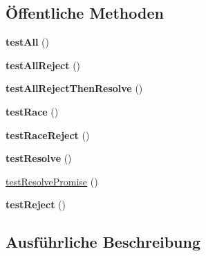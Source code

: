 \subsection*{Öffentliche Methoden}
\begin{DoxyCompactItemize}
\item 
\mbox{\label{class_sabre_1_1_event_1_1_promise_1_1_functions_test_a9659611cd0d111eccab18c668d816061}} 
{\bfseries test\+All} ()
\item 
\mbox{\label{class_sabre_1_1_event_1_1_promise_1_1_functions_test_a2c18fb1e24dab00466c3762a477cb044}} 
{\bfseries test\+All\+Reject} ()
\item 
\mbox{\label{class_sabre_1_1_event_1_1_promise_1_1_functions_test_ac3ce4b2aaa427aaef13137535af15a86}} 
{\bfseries test\+All\+Reject\+Then\+Resolve} ()
\item 
\mbox{\label{class_sabre_1_1_event_1_1_promise_1_1_functions_test_aa9eea58f9d243f922e466fc6dbb68b75}} 
{\bfseries test\+Race} ()
\item 
\mbox{\label{class_sabre_1_1_event_1_1_promise_1_1_functions_test_a9a9a2e7803fdb044f85338f796f509c2}} 
{\bfseries test\+Race\+Reject} ()
\item 
\mbox{\label{class_sabre_1_1_event_1_1_promise_1_1_functions_test_abd692fb6312b541eb6d81006cbea1eef}} 
{\bfseries test\+Resolve} ()
\item 
\mbox{\hyperlink{class_sabre_1_1_event_1_1_promise_1_1_functions_test_adc9ef04cbaa105c449a83f51c4e752aa}{test\+Resolve\+Promise}} ()
\item 
\mbox{\label{class_sabre_1_1_event_1_1_promise_1_1_functions_test_ae678bd576753cb639d41a7437d3ef538}} 
{\bfseries test\+Reject} ()
\end{DoxyCompactItemize}


\subsection{Ausführliche Beschreibung}


